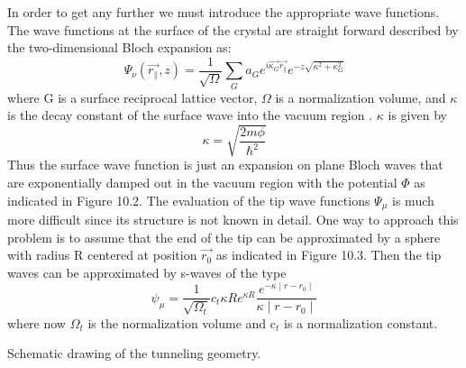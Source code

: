 In order to get any further we must introduce the appropriate wave functions. The wave functions at the surface of the crystal are straight forward  described by the two-dimensional Bloch expansion as:
\begin{equation}
\Psi_ \nu (\overrightarrow{r_\parallel},z) = \frac{1}{\sqrt{\Omega}} \sum _{G} a_G e^{i\overrightarrow{\kappa_G}\overrightarrow{r_\parallel}}e^{-z \sqrt{\kappa^2+\kappa_{G}^{2}}}
\end{equation}
where G is a surface reciprocal lattice vector,  $\Omega$ is a normalization volume, and  $\kappa$ is the decay constant of the surface wave into the vacuum region . $\kappa$ is given by
\begin{equation}
\kappa = \sqrt{\frac{2m\phi}{\hbar^2}}
\end{equation}
Thus the surface wave function is just an expansion on plane Bloch waves that are exponentially damped out in the vacuum region with the potential $\Phi$ as indicated in Figure 10.2. The evaluation of the tip wave functions $\Psi_\mu$ is much more difficult since its structure is not known in detail. One way to approach this problem is to assume that the end of the tip can be approximated by a sphere with radius R centered at position $\overrightarrow{r_0}$ as indicated in Figure 10.3. Then the tip waves can be approximated by s-waves of the type
\begin{equation}
\psi_\mu = \frac{1}{\sqrt{\Omega_t}}c_t \kappa R e^{\kappa R}\frac{e^{-\kappa \mid r-r_0 \mid}}{\kappa \mid r-r_0 \mid}
 \end{equation}
where now $\Omega_t$ is  the  normalization volume and c$_t$ is a normalization constant.

\vspace*{8cm}

 Schematic drawing of the tunneling geometry.

\vspace{1cm}


